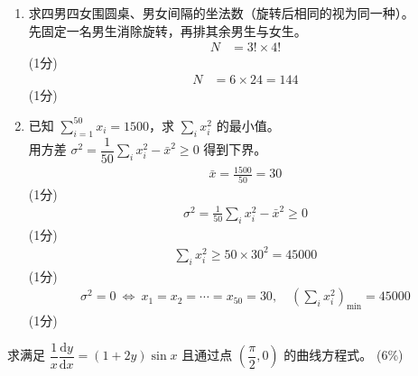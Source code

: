 \begin{solution}
    \begin{enumerate}[label=(\alph*)]
        \item 求四男四女围圆桌、男女间隔的坐法数（旋转后相同的视为同一种）。\\
        先固定一名男生消除旋转，再排其余男生与女生。\\
        \begin{align*}
            N &=3!\times4!
        \end{align*}
        \hfill (1分) \\
        \begin{align*}
            N &=6\times24=144
        \end{align*}
        \hfill (1分)

        \item 已知 $\displaystyle\sum_{i=1}^{50}x_i=1500$，求 $\displaystyle\sum_i x_i^2$ 的最小值。\\
        用方差 $\sigma^2=\dfrac1{50}\displaystyle\sum_i x_i^2-\bar{x}^2\ge0$ 得到下界。\\
        \begin{align*}
            \bar{x}=\frac{1500}{50}=30
        \end{align*}
        \hfill (1分) \\
        \begin{align*}
            \sigma^2=\frac1{50}\sum_i x_i^2-\bar{x}^2\ge0
        \end{align*}
        \hfill (1分) \\
        \begin{align*}
            \sum_i x_i^2\ge50\times30^2=45000
        \end{align*}
        \hfill (1分) \\
        \begin{align*}
            \sigma^2=0\ \Leftrightarrow\ x_1=x_2=\cdots=x_{50}=30,\quad
            \left(\sum_i x_i^2\right)_{\min}=45000
        \end{align*}
        \hfill (1分)
    \end{enumerate}
\end{solution}

\begin{question}[points = 6]
    求满足 $\dfrac{1}{x}\dfrac{\mathrm{d}y}{\mathrm{d}x}=(1+2y)\sin x$ 且通过点 $\left(\dfrac{\pi}{2},0\right)$ 的曲线方程式。
    \hfill (6\%)
\end{question}

